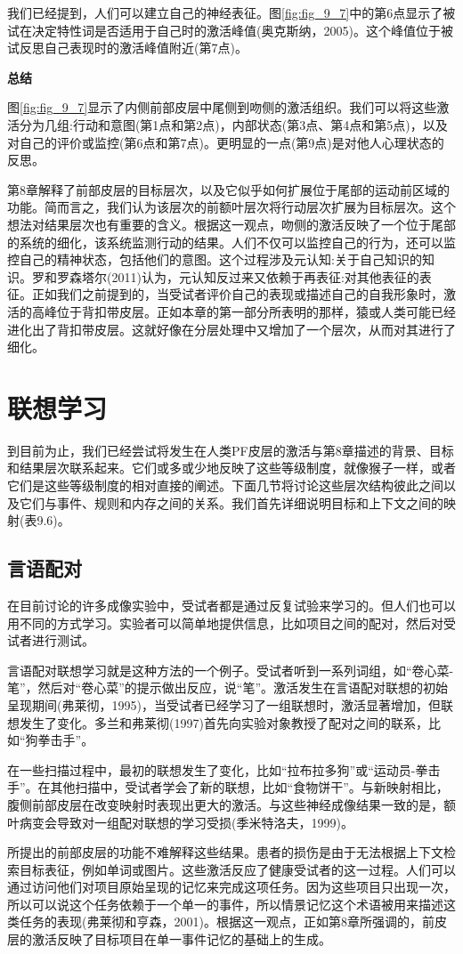 我们已经提到，人们可以建立自己的神经表征。图\ref{fig:fig_9_7}中的第6点显示了被试在决定特性词是否适用于自己时的激活峰值(奥克斯纳，2005)。这个峰值位于被试反思自己表现时的激活峰值附近(第7点)。
\par
\textbf{总结}
\par
图\ref{fig:fig_9_7}显示了内侧前部皮层中尾侧到吻侧的激活组织。我们可以将这些激活分为几组:行动和意图(第1点和第2点)，内部状态(第3点、第4点和第5点)，以及对自己的评价或监控(第6点和第7点)。更明显的一点(第9点)是对他人心理状态的反思。
\par
第8章解释了前部皮层的目标层次，以及它似乎如何扩展位于尾部的运动前区域的功能。简而言之，我们认为该层次的前额叶层次将行动层次扩展为目标层次。这个想法对结果层次也有重要的含义。根据这一观点，吻侧的激活反映了一个位于尾部的系统的细化，该系统监测行动的结果。人们不仅可以监控自己的行为，还可以监控自己的精神状态，包括他们的意图。这个过程涉及元认知:关于自己知识的知识。罗和罗森塔尔(2011)认为，元认知反过来又依赖于再表征:对其他表征的表征。正如我们之前提到的，当受试者评价自己的表现或描述自己的自我形象时，激活的高峰位于背扣带皮层。正如本章的第一部分所表明的那样，猿或人类可能已经进化出了背扣带皮层。这就好像在分层处理中又增加了一个层次，从而对其进行了细化。
\section{联想学习}
\par
到目前为止，我们已经尝试将发生在人类PF皮层的激活与第8章描述的背景、目标和结果层次联系起来。它们或多或少地反映了这些等级制度，就像猴子一样，或者它们是这些等级制度的相对直接的阐述。下面几节将讨论这些层次结构彼此之间以及它们与事件、规则和内存之间的关系。我们首先详细说明目标和上下文之间的映射(表9.6)。
\subsection{言语配对}
\par
在目前讨论的许多成像实验中，受试者都是通过反复试验来学习的。但人们也可以用不同的方式学习。实验者可以简单地提供信息，比如项目之间的配对，然后对受试者进行测试。
\par
言语配对联想学习就是这种方法的一个例子。受试者听到一系列词组，如“卷心菜-笔”，然后对“卷心菜”的提示做出反应，说“笔”。激活发生在言语配对联想的初始呈现期间(弗莱彻，1995)，当受试者已经学习了一组联想时，激活显著增加，但联想发生了变化。多兰和弗莱彻(1997)首先向实验对象教授了配对之间的联系，比如“狗拳击手”。
\par
在一些扫描过程中，最初的联想发生了变化，比如“拉布拉多狗”或“运动员-拳击手”。在其他扫描中，受试者学会了新的联想，比如“食物饼干”。与新映射相比，腹侧前部皮层在改变映射时表现出更大的激活。与这些神经成像结果一致的是，额叶病变会导致对一组配对联想的学习受损(季米特洛夫，1999)。
\par
所提出的前部皮层的功能不难解释这些结果。患者的损伤是由于无法根据上下文检索目标表征，例如单词或图片。这些激活反应了健康受试者的这一过程。人们可以通过访问他们对项目原始呈现的记忆来完成这项任务。因为这些项目只出现一次，所以可以说这个任务依赖于一个单一的事件，所以情景记忆这个术语被用来描述这类任务的表现(弗莱彻和亨森，2001)。根据这一观点，正如第8章所强调的，前皮层的激活反映了目标项目在单一事件记忆的基础上的生成。
\par
